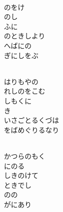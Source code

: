 \documentclass[10pt,b5j]{tarticle} %
\begin{document}
\vspace{1.5em} %
\newcommand{\linespace}{0.5em} %
\newcommand{\blocksize}{0.5\hsize} %
\newcommand{\itemmargin}{6em} %
\begin{enumerate} %
    \setlength{\itemindent}{\itemmargin} %
    \begin{minipage}[c]{\blocksize}
    
        \vspace{\linespace}
        \item~\\
        のをけ\\
        のし\\
        ふに\\
        のときしより\\
        へばにの\\
        ぎにしをぶ
        
        \vspace{\linespace}
        \item~\\
        はりもやの\\
        れしのをこむ\\
        しもくに\\
        き\\
        いさごとるくづは\\
        をばめぐりるなり
        
        \vspace{\linespace}
        \item~\\
        かつらのもく\\
        にのる\\
        しきのけて\\
        ときでし\\
        のの\\
        がにあり
        

\end{minipage}
\end{enumerate}
\end{document}
